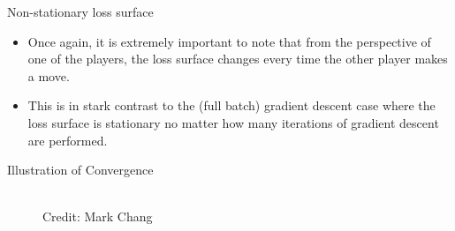 \begin{frame} {Non-stationary loss surface}
   \begin{itemize}
     \item Once again, it is extremely important to note that from the perspective of one of the players, the loss surface changes every time the other player makes a move.
  \vspace{2mm}
     \item This is in stark contrast to the (full batch) gradient descent case where the loss surface is stationary no matter how many iterations of gradient descent are performed.

   \end{itemize}
 \end{frame}

\begin{frame} {Illustration of Convergence}
  \begin{figure}
    \centering
      \tiny{\\Credit: Mark Chang}
  \end{figure}
\end{frame}

